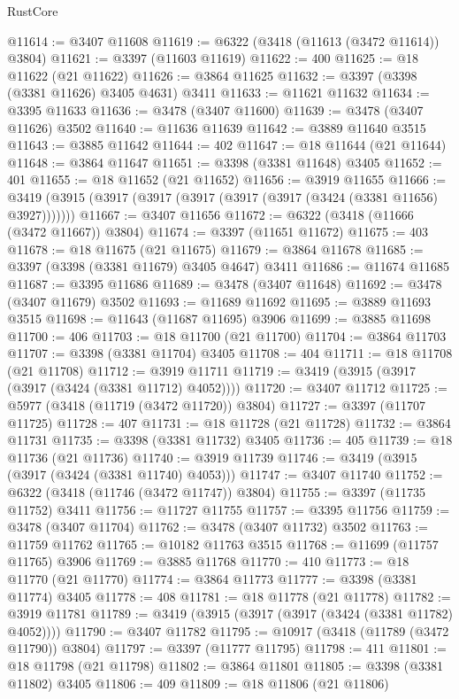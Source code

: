 \begin{lexlean}{RustCore}
\begin{coremodule}
@11614 := @3407 @11608
@11619 := @6322 (@3418 (@11613 (@3472 @11614)) @3804)
@11621 := @3397 (@11603 @11619)
@11622 := 400
@11625 := @18 @11622 (@21 @11622)
@11626 := @3864 @11625
@11632 := @3397 (@3398 (@3381 @11626) @3405 @4631) @3411
@11633 := @11621 @11632
@11634 := @3395 @11633
@11636 := @3478 (@3407 @11600)
@11639 := @3478 (@3407 @11626) @3502
@11640 := @11636 @11639
@11642 := @3889 @11640 @3515
@11643 := @3885 @11642
@11644 := 402
@11647 := @18 @11644 (@21 @11644)
@11648 := @3864 @11647
@11651 := @3398 (@3381 @11648) @3405
@11652 := 401
@11655 := @18 @11652 (@21 @11652)
@11656 := @3919 @11655
@11666 := @3419 (@3915 (@3917 (@3917 (@3917 (@3917 (@3917 (@3424 (@3381 @11656) @3927)))))))
@11667 := @3407 @11656
@11672 := @6322 (@3418 (@11666 (@3472 @11667)) @3804)
@11674 := @3397 (@11651 @11672)
@11675 := 403
@11678 := @18 @11675 (@21 @11675)
@11679 := @3864 @11678
@11685 := @3397 (@3398 (@3381 @11679) @3405 @4647) @3411
@11686 := @11674 @11685
@11687 := @3395 @11686
@11689 := @3478 (@3407 @11648)
@11692 := @3478 (@3407 @11679) @3502
@11693 := @11689 @11692
@11695 := @3889 @11693 @3515
@11698 := @11643 (@11687 @11695) @3906
@11699 := @3885 @11698
@11700 := 406
@11703 := @18 @11700 (@21 @11700)
@11704 := @3864 @11703
@11707 := @3398 (@3381 @11704) @3405
@11708 := 404
@11711 := @18 @11708 (@21 @11708)
@11712 := @3919 @11711
@11719 := @3419 (@3915 (@3917 (@3917 (@3424 (@3381 @11712) @4052))))
@11720 := @3407 @11712
@11725 := @5977 (@3418 (@11719 (@3472 @11720)) @3804)
@11727 := @3397 (@11707 @11725)
@11728 := 407
@11731 := @18 @11728 (@21 @11728)
@11732 := @3864 @11731
@11735 := @3398 (@3381 @11732) @3405
@11736 := 405
@11739 := @18 @11736 (@21 @11736)
@11740 := @3919 @11739
@11746 := @3419 (@3915 (@3917 (@3424 (@3381 @11740) @4053)))
@11747 := @3407 @11740
@11752 := @6322 (@3418 (@11746 (@3472 @11747)) @3804)
@11755 := @3397 (@11735 @11752) @3411
@11756 := @11727 @11755
@11757 := @3395 @11756
@11759 := @3478 (@3407 @11704)
@11762 := @3478 (@3407 @11732) @3502
@11763 := @11759 @11762
@11765 := @10182 @11763 @3515
@11768 := @11699 (@11757 @11765) @3906
@11769 := @3885 @11768
@11770 := 410
@11773 := @18 @11770 (@21 @11770)
@11774 := @3864 @11773
@11777 := @3398 (@3381 @11774) @3405
@11778 := 408
@11781 := @18 @11778 (@21 @11778)
@11782 := @3919 @11781
@11789 := @3419 (@3915 (@3917 (@3917 (@3424 (@3381 @11782) @4052))))
@11790 := @3407 @11782
@11795 := @10917 (@3418 (@11789 (@3472 @11790)) @3804)
@11797 := @3397 (@11777 @11795)
@11798 := 411
@11801 := @18 @11798 (@21 @11798)
@11802 := @3864 @11801
@11805 := @3398 (@3381 @11802) @3405
@11806 := 409
@11809 := @18 @11806 (@21 @11806)

\end{coremodule}
\end{lexlean}
